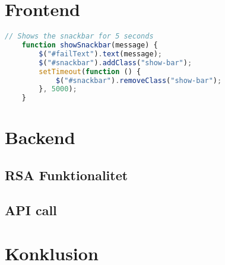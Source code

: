 \documentclass{article}
\begin{document}
    \section{Frontend}\label{sec:frontend}
    \begin{lstlisting}[language=JavaScript,label={lst:kode}]
    // Shows the snackbar for 5 seconds
    function showSnackbar(message) {
        $("#failText").text(message);
        $("#snackbar").addClass("show-bar");
        setTimeout(function () {
            $("#snackbar").removeClass("show-bar");
        }, 5000);
    }
    \end{lstlisting}


    \section{Backend}\label{sec:backend}
    \subsection{RSA Funktionalitet}\label{subsec:rsa-funktionalitet}
    \subsection{API call}\label{subsec:api-call}

    \section{Konklusion}\label{sec:konklusion}
    
    
    
\end{document}

